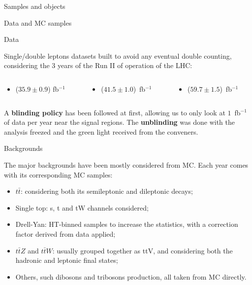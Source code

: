 \documentclass[8pt]{beamer}
\begin{document}
\begin{frame}[standout]
Samples and objects
\end{frame}

\begin{frame}{Data and MC samples}
\justifying
\begin{block}{\centering Data}\end{block}
\alert{Single/double leptons datasets} built to avoid any eventual double counting, considering the 3 years of the Run II of operation of the LHC:
\begin{columns}
\hspace{15pt}
	\begin{column}{0.32\textwidth}
		\begin{itemize}
		\item ($35.9 \pm 0.9$) fb$^{-1}$
		\end{itemize}
	\end{column} \hfill
	\begin{column}{0.32\textwidth}
		\begin{itemize}
		\item ($41.5 \pm 1.0$)~fb$^{-1}$
		\end{itemize}
	\end{column} \hfill
	\begin{column}{0.32\textwidth}
		\begin{itemize}
		\item ($59.7 \pm 1.5$)~fb$^{-1}$
		\end{itemize}
	\end{column} \hfill
\end{columns} \vfill
\vspace{5pt}
A \textbf{blinding policy} has been followed at first, allowing us to only look at $1$~fb$^{-1}$ of data per year near the signal regions. The \textbf{unblinding} was done with the analysis freezed and the green light received from the conveners. \vfill
\vspace{10pt}
\begin{block}{\centering Backgrounds}\end{block}
The \alert{major backgrounds have been mostly considered from MC}. Each year comes with its corresponding MC samples:

\begin{itemize}
\justifying
\item $t \bar t$: considering both its semileptonic and dileptonic decays;%
\item Single top: s, t and tW channels considered;
\item Drell-Yan: HT-binned samples to increase the statistics, with a correction factor derived from data applied;
\item $t\bar{t}Z$ and $t\bar{t}W$: usually grouped together as ttV, and considering both the hadronic and leptonic final states;
\item Others, such dibosons and tribosons production, all taken from MC directly.
\end{itemize} \vfill
\end{frame}
\end{document}
